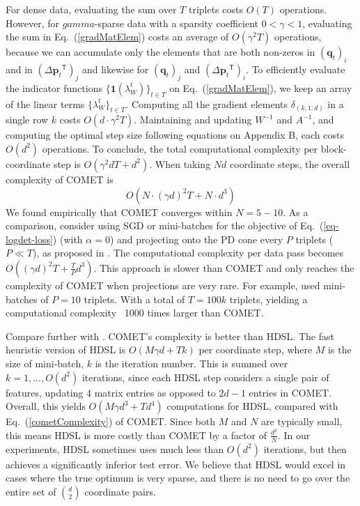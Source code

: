 \documentclass[twoside,11pt]{article}
\newcommand\mat[1]{{#1}}
\renewcommand\vec[1]{\mathbf{#1}}
\newcommand{\T}{{}^\mathsf{T}}
\newcommand{\W}{\mat{W}}
\newcommand{\invA}{A^{-1}}
\renewcommand{\eqref}[1]{Eq.~(\ref{#1})}
\begin{document}
For dense data, evaluating the sum over $T$ triplets costs $O(T)$ operations. However, for $gamma$-sparse data with a sparsity coefficient $ 0< \gamma <1 $, evaluating the sum in \eqref{gradMatElem} costs an average of $O(\gamma^2 T)$ operations, because we can accumulate only the elements that are both non-zeros in $(\vec{q}_{t})_i$ and in $(\Delta\vec{p}_{t}\T)_j  $ and likewise for $(\vec{q}_{t})_j$ and $(\Delta\vec{p}_{t}\T)_i$.   To efficiently evaluate the indicator functions $\{ \textbf{1}(\lambda_{W}^t) \}_{t \in T}$ on \eqref{gradMatElem}, we keep an array of the linear terms $\{\lambda_{W}^t\}_{t \in T}$. Computing all the gradient elements $\delta_{(k,1:d)}$ in a single row $k$ costs $O(d\cdot \gamma^2 T)$.
Maintaining and updating $\W^{-1}$ and $\invA$, and computing the optimal step size following equations on Appendix B, each costs $O(d^2)$ operations. 
To conclude, the total computational complexity per block-coordinate step is $O(\gamma^2 d T + d^2)$. When taking $Nd$ coordinate steps, the overall complexity of COMET is 
\begin{equation}
O(N \cdot (\gamma d)^2 T + N \cdot d^3)
\label{cometComplexity}
\end{equation}
We found empirically that COMET converges within $N= 5 - 10$. As a comparison, consider using SGD or mini-batches for the objective of \eqref{eq-logdet-loss} (with $
\alpha = 0$) and projecting onto the PD cone every $P$ triplets ($P \ll T$), as proposed in \citep{OASIS,qian}. The computational complexity per data pass becomes $O((\gamma d)^2 T + \frac{T}{P} d^3)$. This approach is slower than COMET and only reaches the complexity of COMET when projections are very rare. For example, \citet{qian} used mini-batches of $P=10$ triplets. With a total of $T=100k$ triplets, yielding a computational complexity ~1000 times larger than COMET.

Compare further with \citet{hdsl}. COMET’s complexity is better than HDSL. The fast heuristic version of HDSL is $O(M\gamma d+Tk)$ per coordinate step, where $M$ is the size of mini-batch, $k$ is the iteration number. This is summed over $k=1,...,O(d^2)$ iterations, since each HDSL step considers a single pair of features, updating 4 matrix entries as opposed to $2d-1$ entries in COMET. Overall, this yields $O(M\gamma d^3+Td^4)$ computations for HDSL, compared with \eqref{cometComplexity} of COMET. Since both $M$ and $N$ are typically small, this means HDSL is more costly than COMET by a factor of $\frac{d^2}{N}$. In our experiments, HDSL sometimes uses much less than $O(d^2)$ iterations, but then achieves a significantly inferior test error. We believe that HDSL would excel in cases where the true optimum is very sparse, and there is no need to go over the entire set of $d \choose 2$ coordinate pairs.
\end{document}
